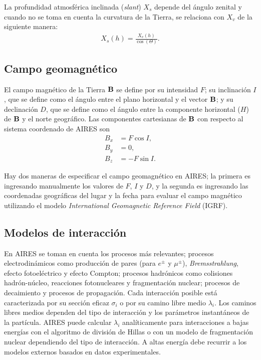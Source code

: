 	La profundidad atmosférica inclinada (\textit{slant}) $X_s$ depende del ángulo zenital y cuando no se toma en cuenta la curvatura de la Tierra, se relaciona con $X_v$ de la siguiente manera:
	\begin{align}
	X_s (h) = \frac{X_v (h)}{\cos(\Theta)}.
	\end{align}
	
	\subsection{Campo geomagnético}
	El campo magnético de la Tierra $\vb{B}$ se define por su intensidad $F$; su inclinación $I$, que se define como el ángulo entre el plano horizontal y el vector $\vb{B}$; y su declinación $D$, que se define como el ángulo entre la componente horizontal ($H$) de $\vb{B}$ y el norte geográfico. Las componentes cartesianas de $\vb{B}$ con respecto al sistema coordenado de AIRES son 
	\begin{align}
	B_x &= F \cos I, \\
	B_y &= 0, \\
	B_z &= -F \sin I.
	\end{align}	 
	
	Hay dos maneras de especificar el campo geomagnético en AIRES; la primera es ingresando manualmente los valores de $F$, $I$ y $D$, y la segunda es ingresando las coordenadas geográficas del lugar y la fecha para evaluar el campo magnético utilizando el modelo \textit{International Geomagnetic Reference Field} (IGRF).  	
	
	\subsection{Modelos de interacción}
	En AIRES se toman en cuenta los procesos más relevantes; procesos electrodinámicos como producción de pares (para $e^{\pm}$ y $\mu^{\pm}$), \textit{Bremsstrahlung}, efecto fotoeléctrico y efecto Compton; procesos hadrónicos como colisiones hadrón-núcleo, reacciones fotonucleares y fragmentación nuclear; procesos de decaimiento y procesos de propagación. Cada interacción posible está caracterizada por su sección eficaz $\sigma_i$ o por su camino libre medio $\lambda_i$. Los caminos libres medios dependen del tipo de interacción y los parámetros instantáneos de la partícula. AIRES puede calcular $\lambda_i$ analíticamente para interacciones a bajas energ\'ias con el algoritmo de divisi\'on de Hillas o con un modelo de fragmentaci\'on nuclear dependiendo del tipo de interacci\'on. A altas energ\'ia debe recurrir a los modelos externos basados en datos experimentales. 
	
